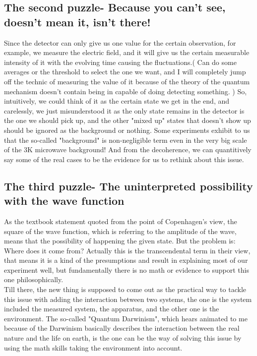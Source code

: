 \documentclass[final,1p,12pt]{elsarticle}
\begin{document}
\subsection{The second puzzle- Because you can't see, doesn't mean it, isn't there!}
Since the detector can only give us one value for the certain observation, for example, we measure the electric field, and it will give us the certain measurable intensity of it with the evolving time causing the fluctuations.( Can do some averages or the threshold to select the one we want, and I will completely jump off the technic of measuring the value of it because of the theory of the quantum mechanism doesn't contain being in capable of doing detecting something. ) So, intuitively, we could think of it as the certain state we get in the end, and carelessly, we just misunderstood it as the only state remains in the detector is the one we should pick up, and the other "mixed up" states that doesn't show up should be ignored as the background or nothing. Some experiments exhibit to us that the so-called "background" is non-negligible term even in the very big scale of the 3K microwave background! And from the decoherence, we can quantitively say some of the real cases to be the evidence for us to rethink about this issue.\\

\subsection{The third puzzle- The uninterpreted possibility with the wave function}
As the textbook statement quoted from the point of Copenhagen's view, the square of the wave function, which is referring to the amplitude of the wave, means that the possibility of happening the given state. But the problem is: Where does it come from? Actually this is the transcendental term in their view, that means it is a kind of the presumptions and result in explaining most of our experiment well, but fundamentally there is no math or evidence to support this one philosophically. \\

Till there, the new thing is supposed to come out as the practical way to tackle this issue with adding the interaction between two systems, the one is the system included the measured system, the apparatus, and the other one is the environment. The so-called "Quantum Darwinism", which hears animated to me because of the Darwinism basically describes the interaction between the real nature and the life on earth, is the one can be the way of solving this issue by using the math skills taking the environment into account.\\  
\end{document}
